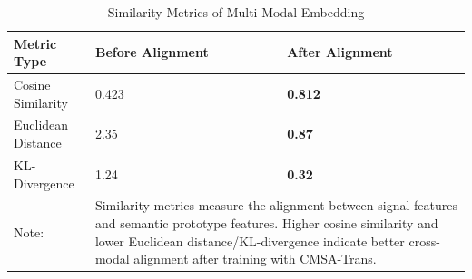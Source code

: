 \begin{table}[htbp]
\centering
\caption{Similarity Metrics of Multi-Modal Embedding}
\label{tab:similarity_metrics}
\begin{tabular}{p{3.5cm}p{3.5cm}p{3.5cm}}
\toprule
\textbf{Metric Type} & \textbf{Before Alignment} & \textbf{After Alignment} \\
\midrule
Cosine Similarity & 0.423 & \textbf{0.812} \\
\midrule
Euclidean Distance & 2.35 & \textbf{0.87} \\
\midrule
KL-Divergence & 1.24 & \textbf{0.32} \\
\midrule
Note: & \multicolumn{2}{p{7cm}}{Similarity metrics measure the alignment between signal features and semantic prototype features. Higher cosine similarity and lower Euclidean distance/KL-divergence indicate better cross-modal alignment after training with CMSA-Trans.} \\
\bottomrule
\end{tabular}
\end{table}